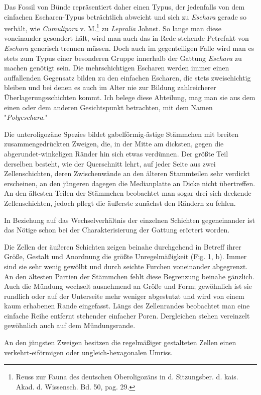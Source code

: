 \documentclass[a4paper, 11pt, oneside, german]{article}
\begin{document}
Das Fossil von Bünde repräsentiert daher einen Typus, der jedenfalls von dem einfachen Escharen-Typus beträchtlich abweicht und sich zu \emph{Eschara} gerade so verhält, wie \emph{Cumulipora} v. M.\footnote{Reuss zur Fauna des deutschen Oberoligozäns in d. Sitzungsber. d. kais. Akad. d. Wissensch. Bd. 50, pag. 29.} zu \emph{Lepralia} Johnst. So lange man diese voneinander gesondert hält, wird man auch das in Rede stehende Petrefakt von \emph{Eschara} generisch trennen müssen. Doch auch im gegenteiligen Falle wird man es stets zum Typus einer besonderen Gruppe innerhalb der Gattung \emph{Eschara} zu machen genötigt sein. Die mehrschichtigen Escharen werden immer einen auffallenden Gegensatz bilden zu den einfachen Escharen, die stets zweischichtig bleiben und bei denen es auch im Alter nie zur Bildung zahlreicherer Überlagerungsschichten kommt. Ich belege diese Abteilung, mag man sie aus dem einen oder dem anderen Gesichtspunkt betrachten, mit dem Namen "\emph{Polyeschara}."

Die unteroligozäne Spezies bildet gabelförmig-ästige Stämmchen mit breiten zusammengedrückten Zweigen, die, in der Mitte am dicksten, gegen die abgerundet-winkeligen Ränder hin sich etwas verdünnen. Der größte Teil derselben besteht, wie der Querschnitt lehrt, auf jeder Seite aus zwei Zellenschichten, deren Zwischenwände an den älteren Stammteilen sehr verdickt erscheinen, an den jüngeren dagegen die Medianplatte an Dicke nicht übertreffen. An den ältesten Teilen der Stämmchen beobachtet man sogar drei sich deckende Zellenschichten, jedoch pflegt die äußerste zunächst den Rändern zu fehlen.

In Beziehung auf das Wechselverhältnis der einzelnen Schichten gegeneinander ist das Nötige schon bei der Charakterisierung der Gattung erörtert worden.

Die Zellen der äußeren Schichten zeigen beinahe durchgehend in Betreff ihrer Größe, Gestalt und Anordnung die größte Unregelmäßigkeit (Fig. 1, b). Immer sind sie sehr wenig gewölbt und durch seichte Furchen voneinander abgegrenzt. An den ältesten Partien der Stämmchen fehlt diese Begrenzung beinahe gänzlich. Auch die Mündung wechselt ausnehmend an Größe und Form; gewöhnlich ist sie rundlich oder auf der Unterseite mehr weniger abgestutzt und wird von einem kaum erhabenen Rande eingefasst. Längs des Zellenrandes beobachtet man eine einfache Reihe entfernt stehender einfacher Poren. Dergleichen stehen vereinzelt gewöhnlich auch auf dem Mündungsrande.

An den jüngsten Zweigen besitzen die regelmäßiger gestalteten Zellen einen verkehrt-eiförmigen oder ungleich-hexagonalen Umriss.
\end{document}
